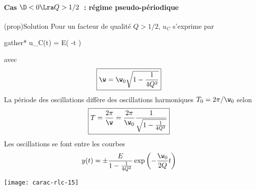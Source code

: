\documentclass[../../main/main.tex]{subfiles}
\begin{document}
\paragraph{Cas $\D < 0 \Lra Q > 1/2$~: régime pseudo-périodique}
\begin{tcb}[label=prop:solupseudoper, sidebyside](prop){Solution}
	Pour un facteur de qualité $Q > 1/2$, $u_C$ s'exprime par
	\begin{empheq}[box=\fbox]{gather*}
		u_C(t) = E\exp \left( -t \right)\times\\
	\end{empheq}
	avec
	\begin{equation*}
		\boxed{\w = \w_0 \sqrt{1 - \frac{1}{4Q^2}}}
	\end{equation*}
	La période des oscillations diffère des oscillations harmoniques $T_0 =
		2\pi/\w_0$ selon
	\begin{equation*}
		\boxed{T = \frac{2\pi}{\w} = \frac{2\pi}{\w_0} \frac{1}{\sqrt{1 -
					\frac{1}{4Q^2}}}}
	\end{equation*}
	\tcblower
	Les oscillations se font entre les courbes
	\[y(t) = \pm \frac{E}{1-\frac{1}{4Q^2}}
		\exp \left( - \frac{\w_0}{2Q}t \right)\]
	\begin{center}
		\texttt{[image: carac-rlc-15]}
	\end{center}
\end{tcb}
\end{document}
